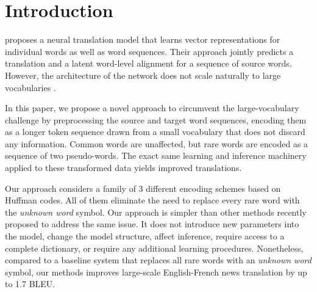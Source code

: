 \section{Introduction}
\label{sec:intro}

 proposes a neural translation model
that learns vector representations for individual words as well as word
sequences. Their approach jointly predicts a translation and a latent
word-level alignment for a sequence of source words. However, the architecture
of the network does not scale naturally to large vocabularies
\cite{journals/corr/JeanCMB14}.

In this paper, we propose a novel approach to circumvent the large-vocabulary
challenge by preprocessing the source and target word sequences, encoding them
as a longer token sequence drawn from a small vocabulary that does not
discard any information. Common words are unaffected, but rare words are
encoded as a sequence of two pseudo-words. The exact same learning and
inference machinery applied to these transformed data yields improved
translations.

Our approach considers a family of 3 different encoding schemes based on
Huffman codes. All of them  eliminate the need to replace every rare word with
the \emph{unknown word} symbol. Our approach is simpler than other methods
recently proposed to address the same issue. It does not introduce new
parameters into the model, change the model structure, affect inference,
require access to a complete dictionary, or require any additional learning
procedures. Nonetheless, compared to a baseline system that replaces all rare
words with an \emph{unknown word} symbol, our methods improves large-scale
English-French news translation by up to 1.7 BLEU.
